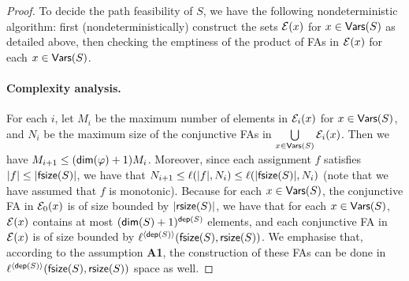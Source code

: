 \begin{proof}
To decide the path feasibility of $S$, we have the following nondeterministic algorithm: first (nondeterministically) construct the sets $\mathcal{E}(x)$ for $x \in \mathsf{Vars}(S)$ as detailed above, then 
checking the emptiness of the product of FAs in $\mathcal{E}(x)$ for each $x \in \mathsf{Vars}(S)$.

\paragraph{Complexity analysis.} For each $i$, 
let $M_i$ be the maximum number of elements in $\mathcal{E}_i(x)$ for $x  \in \mathsf{Vars}(S)$,
and $N_i$ be the maximum size of the conjunctive FAs in $\bigcup \limits_{x \in \mathsf{Vars}(S)} \mathcal{E}_i(x)$.
Then we have $M_{i+1} \le (\mathsf{dim}(\varphi)+1)M_i $. Moreover, since each assignment $f$ satisfies   $|f| \le |\mathsf{fsize}(S)|$, we have that $N_{i+1} \le \ell(|f|, N_i) \le \ell(|\mathsf{fsize}(S)|, N_i)$ (note that we have assumed that $f$ is monotonic). Because for each $x \in \mathsf{Vars}(S)$, %
the conjunctive FA in $\mathcal{E}_0(x)$ is of size bounded by $|\mathsf{rsize}(S)|$, we have that for each $x \in \mathsf{Vars}(S)$, $\mathcal{E}(x)$ contains at most $(\mathsf{dim}(S)+1)^{\mathsf{dep}(S)}$ elements, and each conjunctive FA in $\mathcal{E}(x)$ is of size bounded by $\ell^{\langle \mathsf{dep}(S) \rangle}(\mathsf{fsize}(S), \mathsf{rsize}(S))$. 
We emphasise that, according to the assumption \textbf{A1}, the construction of these FAs can be done in $\ell^{\langle \mathsf{dep}(S) \rangle}(\mathsf{fsize}(S), \mathsf{rsize}(S))$ space as well. 


\end{proof}
